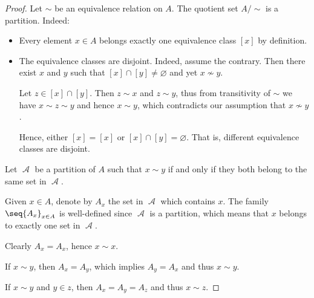 \begin{proof}
   Let \( {\sim} \) be an equivalence relation on \( A \). The quotient set \( A / {\sim} \) is a partition. Indeed:
  \begin{itemize}
    \item Every element \( x \in A \) belongs exactly one equivalence class \( [x] \) by definition.

    \item The equivalence classes are disjoint. Indeed, assume the contrary. Then there exist \( x \) and \( y \) such that \( [x] \cap [y] \neq \varnothing \) and yet \( x \not\sim y \).

    Let \( z \in [x] \cap [y] \). Then \( z \sim x \) and \( z \sim y \), thus from transitivity of \( {\sim} \) we have \( x \sim z \sim y \) and hence \( x \sim y \), which contradicts our assumption that \( x \not\sim y \).

    Hence, either \( [x] = [x] \) or \( [x] \cap [y] = \varnothing \). That is, different equivalence classes are disjoint.
  \end{itemize}

   Let \( \mscrA \) be a partition of \( A \) such that \( x \sim y \) if and only if they both belong to the same set in \( \mscrA \).

  Given \( x \in A \), denote by \( A_x \) the set in \( \mscrA \) which contains \( x \). The family \( \seq{ A_x }_{x \in A} \) is well-defined since \( \mscrA \) is a partition, which means that \( x \) belongs to exactly one set in \( \mscrA \).

   Clearly \( A_x = A_x \), hence \( x \sim x \).

   If \( x \sim y \), then \( A_x = A_y \), which implies \( A_y = A_x \) and thus \( x \sim y \).

   If \( x \sim y \) and \( y \in z \), then \( A_x = A_y = A_z \) and thus \( x \sim z \).
\end{proof}

